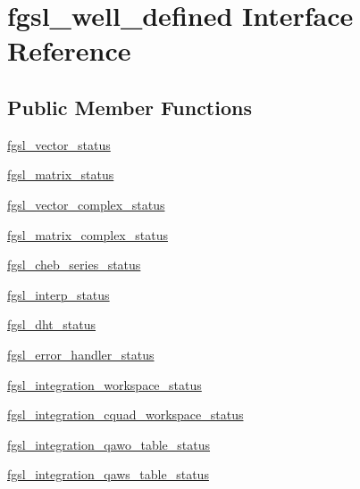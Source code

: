 \hypertarget{interfacefgsl__well__defined}{\section{fgsl\-\_\-well\-\_\-defined Interface Reference}
\label{interfacefgsl__well__defined}
}
\subsection*{Public Member Functions}
\begin{DoxyCompactItemize}
\item 
\hyperlink{interfacefgsl__well__defined_a33e0c65aa79c88ad81052e764091bc27}{fgsl\-\_\-vector\-\_\-status}
\item 
\hyperlink{interfacefgsl__well__defined_a07331a0d9cb8799a4e32602c2dd4c50d}{fgsl\-\_\-matrix\-\_\-status}
\item 
\hyperlink{interfacefgsl__well__defined_a9ba185d2dadb44bf1f2d405fa3db0738}{fgsl\-\_\-vector\-\_\-complex\-\_\-status}
\item 
\hyperlink{interfacefgsl__well__defined_af1397e3ea23d92c940730db99bbd82f7}{fgsl\-\_\-matrix\-\_\-complex\-\_\-status}
\item 
\hyperlink{interfacefgsl__well__defined_a31c950085c0b207f97e87f5a929330fe}{fgsl\-\_\-cheb\-\_\-series\-\_\-status}
\item 
\hyperlink{interfacefgsl__well__defined_a73f7ca7b279395bf73fdfe024d2fcae9}{fgsl\-\_\-interp\-\_\-status}
\item 
\hyperlink{interfacefgsl__well__defined_a63cea1503bb0b2a08e8fbb4bdc4dadc5}{fgsl\-\_\-dht\-\_\-status}
\item 
\hyperlink{interfacefgsl__well__defined_a7c228dd633ee2c67f6a054d29eae41ff}{fgsl\-\_\-error\-\_\-handler\-\_\-status}
\item 
\hyperlink{interfacefgsl__well__defined_a5ea29ed879fe64d5bf15de25dcac8d8d}{fgsl\-\_\-integration\-\_\-workspace\-\_\-status}
\item 
\hyperlink{interfacefgsl__well__defined_acf0bb8ed00359821932d9ef64859dfb0}{fgsl\-\_\-integration\-\_\-cquad\-\_\-workspace\-\_\-status}
\item 
\hyperlink{interfacefgsl__well__defined_adc3349fd6c0f0a2ac03c2189126b97d3}{fgsl\-\_\-integration\-\_\-qawo\-\_\-table\-\_\-status}
\item 
\hyperlink{interfacefgsl__well__defined_a09abcd015959c50185f8b45c7ebcf98f}{fgsl\-\_\-integration\-\_\-qaws\-\_\-table\-\_\-status}

\end{DoxyCompactItemize}
